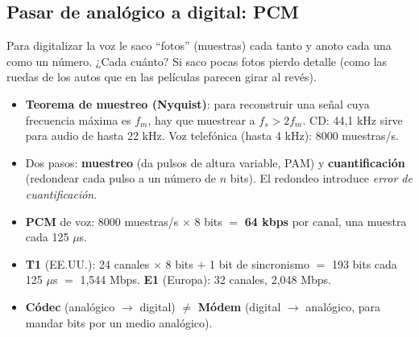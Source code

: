 \documentclass[10pt,a4paper]{article}
\newcommand{\term}[1]{\textbf{\color{azul}#1}}
\begin{document}
\subsection{Pasar de analógico a digital: PCM}
\begin{idea}
Para digitalizar la voz le saco ``fotos'' (muestras) cada tanto y anoto cada una como un número.
¿Cada cuánto? Si saco pocas fotos pierdo detalle (como las ruedas de los autos que en las películas parecen girar al revés).
\end{idea}
\begin{itemize}
  \item \term{Teorema de muestreo (Nyquist)}: para reconstruir una señal cuya frecuencia máxima es $f_m$, hay que muestrear a \textbf{$f_s > 2 f_m$}.
        CD: 44,1 kHz sirve para audio de hasta 22 kHz. Voz telefónica (hasta 4 kHz): 8000 muestras/s.
  \item Dos pasos: \term{muestreo} (da pulsos de altura variable, PAM) y \term{cuantificación} (redondear cada pulso a un número de $n$ bits). El redondeo introduce \emph{error de cuantificación}.
  \item \term{PCM} de voz: 8000 muestras/s $\times$ 8 bits $=$ \textbf{64 kbps} por canal, una muestra cada 125 $\mu$s.
  \item \term{T1} (EE.UU.): 24 canales $\times$ 8 bits $+$ 1 bit de sincronismo $=$ 193 bits cada 125 $\mu$s $=$ 1,544 Mbps.
        \term{E1} (Europa): 32 canales, 2,048 Mbps.
  \item \term{Códec} (analógico $\to$ digital) $\neq$ \term{Módem} (digital $\to$ analógico, para mandar bits por un medio analógico).
\end{itemize}
\end{document}
